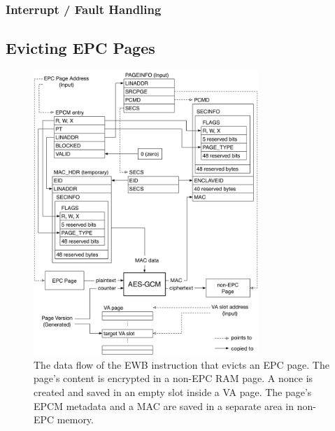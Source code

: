 \subsubsection{Interrupt / Fault Handling}
\label{sec:aex}





\subsection{Evicting EPC Pages}
\label{sec:sgx_ewb}



\begin{figure}[hbt!]
  \centering
  \includegraphics[width=85mm]{figures/sgx_ewb.pdf}
  \caption{
    The data flow of the EWB instruction that evicts an EPC page. The page's
    content is encrypted in a non-EPC RAM page. A nonce is created and saved
    in an empty slot inside a VA page. The page's EPCM metadata and a MAC
    are saved in a separate area in non-EPC memory.
  }
  \label{fig:sgx_ewb}
\end{figure}



